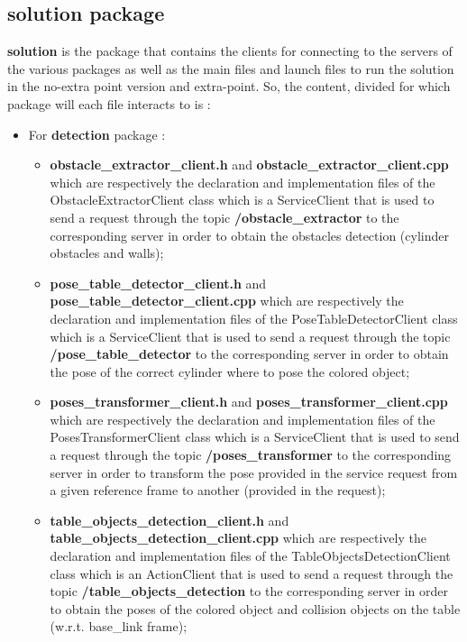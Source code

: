 \subsection{solution package}
\textbf{solution} is the package that contains the clients for connecting to the servers of the various packages as well as the main files and launch files to run the solution in the no-extra point version and extra-point. 
So, the content, divided for which package will each file interacts to is :
\begin{itemize}
    \item For \textbf{detection} package :
    \begin{itemize}
        \item \textbf{obstacle\_extractor\_client.h} and \textbf{obstacle\_extractor\_client.cpp} which are respectively the declaration and implementation files of the ObstacleExtractorClient class which is a ServiceClient that is used to send a request through the topic \textbf{/obstacle\_extractor} to the corresponding server in order to obtain the obstacles detection (cylinder obstacles and walls); 
        \item \textbf{pose\_table\_detector\_client.h} and \textbf{pose\_table\_detector\_client.cpp} which are respectively the declaration and implementation files of the PoseTableDetectorClient class which is a ServiceClient that is used to send a request through the topic \textbf{/pose\_table\_detector} to the corresponding server in order to obtain the pose of the correct cylinder where to pose the colored object;
        \item \textbf{poses\_transformer\_client.h} and \textbf{poses\_transformer\_client.cpp} which are respectively the declaration and implementation files of the PosesTransformerClient class which is a ServiceClient that is used to send a request through the topic \textbf{/poses\_transformer} to the corresponding server in order to transform the pose provided in the service request from a given reference frame to another (provided in the request);
        \item \textbf{table\_objects\_detection\_client.h} and \textbf{table\_objects\_detection\_client.cpp} which are respectively the declaration and implementation files of the TableObjectsDetectionClient class which is an ActionClient that is used to send a request through the topic \textbf{/table\_objects\_detection} to the corresponding server in order to obtain the poses of the colored object and collision objects on the table (w.r.t. base\_link frame);  

\end{itemize}
\end{itemize}
